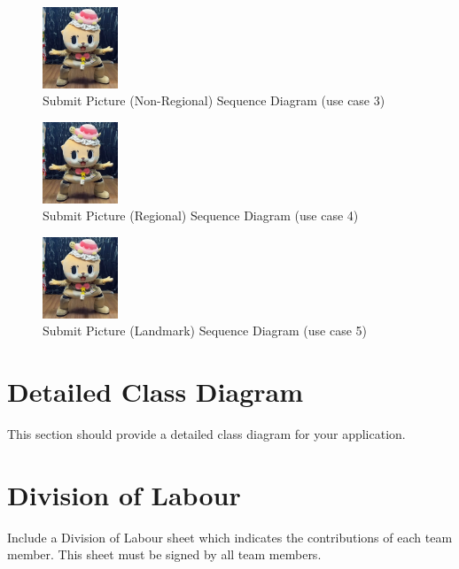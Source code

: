 \documentclass[]{article}
\begin{document}

\begin{figure}[H]
    \centering
    \includegraphics[width=0.2\textwidth]{removelater.jpg} %
    \caption{Submit Picture (Non-Regional) Sequence Diagram (use case 3)}
\end{figure}

\begin{figure}[H]
    \centering
    \includegraphics[width=0.2\textwidth]{removelater.jpg} %
    \caption{Submit Picture (Regional) Sequence Diagram (use case 4)}
\end{figure}

\begin{figure}[H]
    \centering
    \includegraphics[width=0.2\textwidth]{removelater.jpg} %
    \caption{Submit Picture (Landmark) Sequence Diagram (use case 5)}
\end{figure}



\section{Detailed Class Diagram}
\label{sec:detailed_class_diagram}
This section should provide a detailed class diagram for your application.

\appendix
\section{Division of Labour}
\label{sec:division_of_labour}
Include a Division of Labour sheet which indicates the contributions of each team member. This sheet must be signed by all team members.
\end{document}
